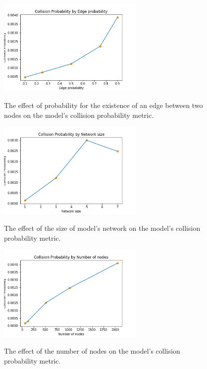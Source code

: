 \documentclass{article}
\begin{document}
\begin{figure}
    \begin{center}
        \includegraphics[width=7cm]{../figures/Collision_Probability_edge_prob.png}\\
        \caption{The effect of probability for the existence of an edge between two nodes on the model's collision probability metric.}
    \end{center}
\end{figure}    
\begin{figure}
    \begin{center}
        \includegraphics[width=7cm]{../figures/Collision_Probability_network_size.png}\\
        \caption{The effect of the size of model's network on the model's collision probability metric.}
    \end{center}
\end{figure}    
\begin{figure}
    \begin{center}
        \includegraphics[width=7cm]{../figures/Collision_Probability_num_nodes.png}\\
        \caption{The effect of the number of nodes on the model's collision probability metric.}
    \end{center}
\end{figure}    
\end{document}
